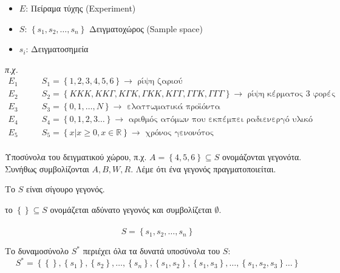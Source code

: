 \documentclass[11pt,a4paper,titlepage,draft]{article}
\begin{document}
\begin{itemize}
\item \(E\): Πείραμα τύχης (\textlatin{Experiment})
\item \(S\): \( \left\lbrace s_1,s_2, \dots , s_n \right\rbrace\) Δειγματοχώρος (\textlatin{Sample space})
\item \(s_i\): Δειγματοσημεία
\end{itemize}

\textit{π.χ.}
\begin{align*}
E_1 \qquad & S_1 = \left\lbrace 1,2,3,4,5,6 \right\rbrace \rightarrow \text{ ρίψη ζαριού}\\
E_2 \qquad & S_2 = \left\lbrace KKK, KK\Gamma , K\Gamma K, \Gamma K K, K \Gamma \Gamma, \Gamma \Gamma K, \Gamma \Gamma \Gamma \right\rbrace \rightarrow \text{ ρίψη κέρματος 3 φορές} \\
E_3 \qquad & S_3 = \left\lbrace 0,1,\dots,N \right\rbrace \rightarrow \text{ ελαττωματικά προϊόντα}\\
E_4 \qquad & S_4 = \left\lbrace 0,1,2,3\dots \right\rbrace \rightarrow \text{ αριθμός ατόμων που εκπέμπει ραδιενεργό υλικό}\\
E_5 \qquad & S_5 = \left\lbrace x | x \geq 0, x \in \mathbb R \right\rbrace \rightarrow \text{ χρόνος γενονότος}
\end{align*}

\paragraph{}
Υποσύνολα του δειγματικού χώρου, π.χ. \(A = \left\lbrace 4,5,6 \right\rbrace \subseteq S\) ονομάζονται γεγονότα. Συνήθως συμβολίζονται \(A,B,W,R\). Λέμε ότι ένα γεγονός πραγματοποιείται.

Το \(S\) είναι σίγουρο γεγονός.

το \(\left\lbrace \right\rbrace \subseteq S \) ονομάζεται αδύνατο γεγονός και συμβολίζεται \( \emptyset \).

\paragraph{}
\[S =  \left\lbrace s_1,s_2,\dots,s_n  \right\rbrace \]

Το δυναμοσύνολο \(S^*\) περιέχει όλα τα δυνατά υποσύνολα του \(S\):
\[S^* =  \left\lbrace  \left\lbrace  \right\rbrace,  \left\lbrace s_1 \right\rbrace, \left\lbrace s_2 \right\rbrace, \dots,  \left\lbrace s_n  \right\rbrace,  \left\lbrace s_1,s_2 \right\rbrace, \left\lbrace s_1,s_3 \right\rbrace, \dots,  \left\lbrace s_1,s_2,s_3 \right\rbrace \dots  \right\rbrace \]
\end{document}

